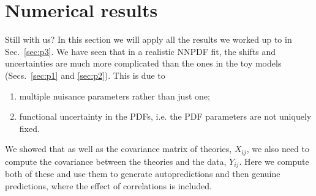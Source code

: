 \section{Numerical results}
\label{sec:p4}
Still with us? In this section we will apply all the results we worked up to in Sec.~\ref{sec:p3}. We have seen that in a realistic NNPDF fit, the shifts and uncertainties are much more complicated than the ones in the toy models (Secs.~\ref{sec:p1} and \ref{sec:p2}). This is due to
\begin{enumerate}
\item multiple nuisance parameters rather than just one;
\item functional uncertainty in the PDFs, i.e. the PDF parameters are not uniquely fixed.
\end{enumerate}
We showed that as well as the covariance matrix of theories, $X_{ij}$, we also need to compute the covariance between the theories and the data, $Y_{ij}$. Here we compute both of these and use them to generate autopredictions and then genuine predictions, where the effect of correlations is included.

